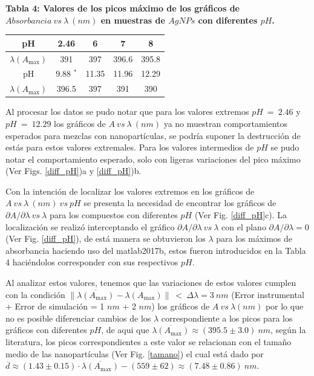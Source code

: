\textbf{Tabla 4: Valores de los picos máximo de los gráficos de $Absorbancia~vs~\lambda~(nm)$ en muestras de $AgNPs$ con diferentes $pH$.}

\begin{tabular}{|c|c|c|c|c|}
    \hline
    pH &  2.46 & 6 & 7 & 8 \\
    \hline
    $\lambda(A_{\max})$ & 391 & 397 & 396.6 & 395.8\\
    \hline\hline
    pH & 9.88 $^*$& 11.35 & 11.96 & 12.29\\
    \hline
    $\lambda(A_{\max})$ & 396.5 & 397 & 391 & 390\\
    \hline
\end{tabular}

Al procesar los datos se pudo notar que para los valores extremos $pH~=~2.46$ y $pH~=~12.29$ los gráficos de $A~vs~\lambda ~(nm)$ ya no muestran comportamientos esperados para mezclas con nanopartículas, se podría suponer la destrucción de estás para estos valores extremales. Para los valores intermedios de $pH$ se pudo notar el comportamiento esperado, solo con ligeras variaciones del pico máximo (Ver Figs. \ref{diff_pH})a y \ref{diff_pH})b.

Con la intención de localizar los valores extremos en los gráficos de $A~vs~\lambda ~(nm)~vs~pH$ se presenta la necesidad de encontrar los gráficos de $\partial A/\partial \lambda~vs~\lambda$ para los compuestos con diferentes $pH$ (Ver Fig. \ref{diff_pH}c). La localización se realizó interceptando el gráfico $\partial A/\partial \lambda~vs~\lambda$ con el plano $\partial A/\partial \lambda = 0$ (Ver Fig. \ref{diff_pH}), de está manera se obtuvieron los $\lambda$ para los máximos de absorbancia haciendo uso del matlab2017b, estos fueron introducidos en la Tabla 4 haciéndolos corresponder con sus respectivos $pH$. 

Al analizar estos valores, tenemos que las variaciones de estos valores cumplen con la condición $ \|\overline{ \lambda (A_{\max}) }  - \lambda ( A_{\max})\|~ < ~\Delta\lambda=3 ~nm$  (Error instrumental + Error de simulación = 1 $nm$ + 2 $nm$) los gráficos de $A~vs~\lambda (nm)$ por lo que no es posible diferenciar cambios de los $\lambda$ correspondiente a los picos para los gráficos con diferentes $pH$, de aqui que $\overline{ \lambda ( A_{\max} )} \approx (395.5\pm 3.0)~nm$, según la literatura, los picos correspondientes a este valor se relacionan con el tamaño medio de las nanopartículas (Ver Fig. \ref{tamano}) el cual está dado por 
$\overline{d} \approx  (1.43\pm 0.15)\cdot  \overline{ \lambda ( A_{\max} )} -(559\pm 62)\approx (7.48\pm 0.86)~n m$.

